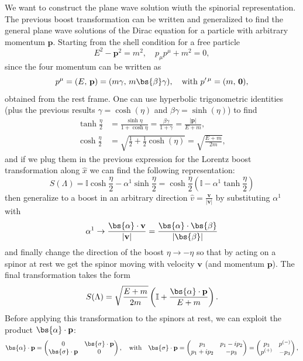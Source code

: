 We want to construct the plane wave solution wiuth the spinorial representation. The previous boost transformation can be written and generalized to find the general plane wave solutions of the Dirac equation for a particle with arbitrary momentum \(\mathbf{p}\). Starting from the shell condition for a free particle
\[
    E^2 - \mathbf{p}^2 = m^2, \quad p_\mu p^\mu + m^2 = 0,
\]
since the four momentum can be written as
\[
    p^{\mu} = (E,\, \mathbf{p})= (m\gamma,\, m \bs{\beta} \gamma), \quad \text{with } p^{\prime\,\mu} = (m,\, \mathbf{0}),
\]
obtained from the rest frame. One can use hyperbolic trigonometric identities (plus the previous results \(\gamma = \cosh(\eta)\) and \(\beta \gamma = \sinh(\eta)\)) to find
\[
    \begin{aligned}
        \tanh{\frac{\eta}{2}} & = \frac{\sinh{\eta}}{1 + \cosh{\eta}} = \frac{\beta \gamma}{1 + \gamma} = \frac{\vert \mathbf{p} \vert}{E + m}, \\
        \cosh{\frac{\eta}{2}} & = \sqrt{\frac{1}{2} + \frac{1}{2}\cosh(\eta)} = \sqrt{\frac{E + m}{2m}},
    \end{aligned}
\]
and if we plug them in the previous expression for the Lorentz boost transformation along \(\hat{x}\) we can find the following representation:
\[
    S(\Lambda) = \mathbb{I}\cosh{\frac{\eta}{2}} - \alpha^1 \sinh{\frac{\eta}{2}} = \cosh{\frac{\eta}{2}} \left( \mathbb{I} - \alpha^1 \tanh{\frac{\eta}{2}} \right)
\]
then generalize to a boost in an arbitrary direction \(\hat{v} = \frac{\mathbf{v}}{\vert \mathbf{v} \vert }\) by substituting \(\alpha^1\) with
\[
    \alpha^1 \to \frac{\bs{\alpha}\cdot \mathbf{v}}{\vert \mathbf{v} \vert } = \frac{\bs{\alpha}\cdot\bs{\beta}}{\vert \bs{\beta}\vert}
\]
and finally change the direction of the boost \(\eta \to -\eta\)  so that by acting on a spinor at rest we get the spinor moving with velocity \(\mathbf{v}\) (and momentum \(\mathbf{p}\)). The final transformation takes the form
\begin{equation}
    S(\Lambda) = \sqrt{\frac{E + m}{2m}} \left( \mathbb{I} + \frac{\bs{\alpha} \cdot \mathbf{p}}{E + m} \right).
    \label{eq:dirac_lorentz_boost}
\end{equation}
Before applying this transformation to the spinors at rest, we can exploit the product \(\bs{\alpha} \cdot \mathbf{p}\):
\[
    \bs{\alpha} \cdot \mathbf{p} = \begin{pmatrix}
        0                            & \bs{\sigma} \cdot \mathbf{p} \\
        \bs{\sigma} \cdot \mathbf{p} & 0
    \end{pmatrix}, \quad \text{with} \quad \bs{\sigma} \cdot \mathbf{p} = \begin{pmatrix}
        p_3         & p_1 - i p_2 \\
        p_1 + i p_2 & -p_3
    \end{pmatrix} = \begin{pmatrix}
        p_3     & p^{(-)} \\
        p^{(+)} & -p_3
    \end{pmatrix},
\]
